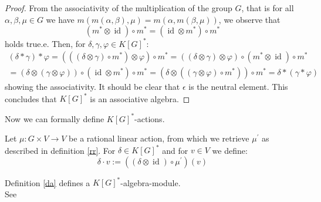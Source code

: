 \begin{proof}
  From the associativity of the multiplication of the group $G$, that is for all $\alpha,\beta,\mu \in G$ we have $m(m(\alpha,\beta),\mu) = m(\alpha,m(\beta,\mu))$, we observe that
  \begin{equation}
    \left(m^\ast \otimes \operatorname{id} \right) \circ m^\ast = \left( \operatorname{id} \otimes m^\ast \right) \circ m^\ast
  \end{equation}
  holds true.e.
  Then, for $\delta, \gamma, \varphi \in K \left\lbrack G \right\rbrack^\ast$:
  \begin{equation}
    \begin{aligned}
      \left( \delta \ast \gamma \right) \ast \varphi
      = \left( \left( \left( \delta \otimes \gamma \right) \circ m^\ast \right) \otimes \varphi \right) \circ m^\ast
      = \left( (\delta \otimes \gamma) \otimes \varphi \right) \circ \left( m^\ast \otimes \operatorname{id} \right) \circ m^\ast \\
      = \left( \delta \otimes (\gamma \otimes \varphi) \right) \circ \left( \operatorname{id} \otimes m^\ast \right) \circ m^\ast
      = \left( \delta \otimes \left( \left( \gamma \otimes \varphi \right) \circ m^\ast \right) \right) \circ m^\ast
      = \delta \ast \left( \gamma \ast \varphi \right)
    \end{aligned}
  \end{equation}
  showing the associativity.
  It should be clear that $\epsilon$ is the neutral element.
  This concludes that $K \left\lbrack G \right\rbrack^\ast$ is an associative algebra.
\end{proof}

Now we can formally define $K [G]^\ast$-actions.

\begin{definition}\label{da}
  Let $\mu \colon G \times V \longrightarrow V$ be a rational linear action, from which we retrieve $\mu^\prime$ as described in definition \ref{rr}.
  For $\delta \in K[G]^\ast$ and for $v \in V$ we define:
  \begin{equation}
    \delta \cdot v := \left(\left( \delta \otimes \operatorname{id} \right) \circ \mu^\prime \right) \left(v\right)
  \end{equation}
\end{definition}

\begin{proposition}
  Definition \ref{da} defines a $K[G]^\ast$-algebra-module.\\
  See \cite[A2.10]{DK15}
\end{proposition}

